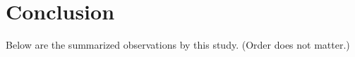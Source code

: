 \documentclass[10pt]{article}
\begin{document}
\clearpage
\newpage

\section{Conclusion}

Below are the summarized observations by this study. (Order does not matter.)

\end{document}
